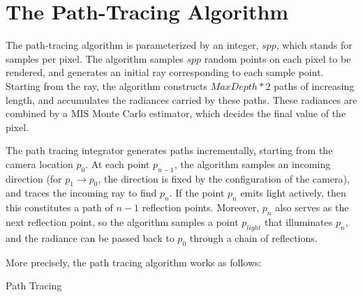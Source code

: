 \section{The Path-Tracing Algorithm}

The path-tracing algorithm is parameterized by an integer, $spp$, which stands for samples per pixel. The algorithm samples $spp$ random points on each pixel to be rendered, and generates an initial ray corresponding to each sample point. Starting from the ray, the algorithm constructs $MaxDepth*2$ paths of increasing length, and accumulates the radiances carried by these paths. These radiances are combined by a MIS Monte Carlo estimator, which decides the final value of the pixel.

The path tracing integrator generates paths incrementally, starting from the camera location $p_0$. At each point $p_{n-1}$, the algorithm samples an incoming direction (for $p_{1}\to p_0$, the direction is fixed by the configuration of the camera), and traces the incoming ray to find $p_{n}$. If the point $p_{n}$ emits light actively, then this constitutes a path of $n-1$ reflection points. Moreover, $p_{n}$ also serves as the next reflection point, so the algorithm samples a point $p_{light}$ that illuminates $p_{n}$, and the radiance can be passed back to $p_0$ through a chain of reflections.


More precisely, the path tracing algorithm works as follows:


\begin{algorithm}[H]
    \label{Path Tracing}
    \caption{Path Tracing}
\end{algorithm}

